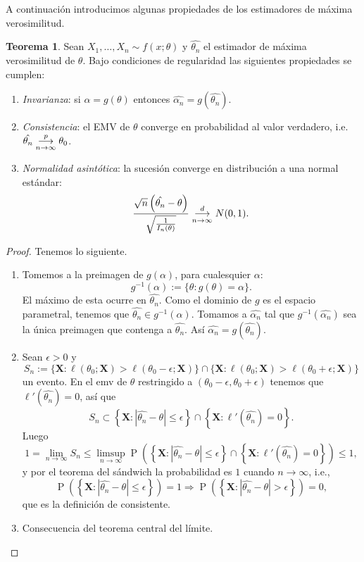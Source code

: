 \documentclass[11pt,letterpaper]{article}
\newcommand{\prob}{\ensuremath{\operatorname{P}}}
\theoremstyle{definition}
\theoremstyle{theorem}
\newtheorem{theorem}[definition]{Teorema}
\theoremstyle{remark}
\begin{document}
	A continuación introducimos algunas propiedades de los estimadores de máxima verosimilitud.
	\begin{theorem} \label{teoremaProps}
		Sean \(X_1,\dots,X_n\sim f(x;\theta)\) y \(\hat{\theta_n}\) el estimador de máxima verosimilitud de \(\theta\). Bajo condiciones de regularidad las siguientes propiedades se cumplen:
		\begin{enumerate}
			\item \textit{Invarianza}: si \(\alpha=g(\theta)\) entonces \(\hat{\alpha_n}=g(\hat{\theta_n})\).
			\item \textit{Consistencia}: el EMV de \(\theta\) converge en probabilidad al valor verdadero, i.e. \(\hat{\theta_n}\overunderset{p}{n\to\infty}{\longrightarrow}\theta_0\).
			\item \textit{Normalidad asintótica}: la sucesión converge en distribución a una normal estándar: \[\frac{\sqrt{n}\left(\hat{\theta_n}-\theta\right)}{\sqrt{\frac{1}{I_n(\theta)}}}\overunderset{d}{n\to\infty} {\longrightarrow}N(0,1).\]
		\end{enumerate}
	\end{theorem}
	\begin{proof}
		Tenemos lo siguiente.
		\begin{enumerate}
			\item Tomemos a la preimagen de \(g(\alpha)\), para cualesquier \(\alpha\): \[g^{-1}(\alpha):=\{\theta:g(\theta)=\alpha\}.\] El máximo de esta ocurre en \(\hat{\theta_n}\). Como el dominio de \(g\) es el espacio parametral, tenemos que \(\hat {\theta_n}\in g^{-1}(\alpha)\). Tomamos a \(\hat{\alpha_n}\) tal que \(g^{-1}(\hat{\alpha_n})\) sea la única preimagen que contenga a \(\hat{\theta_n}\). Así \(\hat{\alpha_n}=g(\hat {\theta_n})\).
			\item Sean \(\epsilon>0\) y \[S_n:=\{\boldsymbol{X}:\ell(\theta_0;\boldsymbol{X})>\ell(\theta_0-\epsilon;\boldsymbol{X})\}\cap\{\boldsymbol{X}:\ell(\theta_0;\boldsymbol{X})>\ell(\theta_0+\epsilon;\boldsymbol{X})\}\] un evento. En el emv de \(\theta\) restringido a \((\theta_0-\epsilon,\theta_0+\epsilon)\) tenemos que \(\ell'(\hat{\theta_n})=0\), así que
			\[S_n\subset\left\{\boldsymbol{X}:\left|\hat{\theta_n}-\theta\right|\leq\epsilon\right\}\cap\left\{\boldsymbol{X}:\ell'\left(\hat{\theta_n}\right)=0\right\}.\]
			Luego
			\[1=\lim_{n\to\infty}S_n\leq\underset{n\to\infty}{\limsup}\prob\left(\left\{\boldsymbol{X}:\left|\hat{\theta_n}-\theta\right|\leq\epsilon\right\}\cap\left\{\boldsymbol{X}:\ell'\left(\hat{\theta_n}\right)=0\right\}\right)\leq1,\]
			y por el teorema del sándwich la probabilidad es \(1\) cuando \(n\to\infty\), i.e.,
			\[\prob\left(\left\{\boldsymbol{X}:\left|\hat{\theta_n}-\theta\right|\leq\epsilon\right\}\right)=1\Longrightarrow\prob\left(\left\{\boldsymbol{X}:\left|\hat{\theta_n}-\theta\right|>\epsilon\right\}\right)=0,\]
			que es la definición de consistente.
			\item Consecuencia del teorema central del límite.
		\end{enumerate}
	\end{proof}
\end{document}
